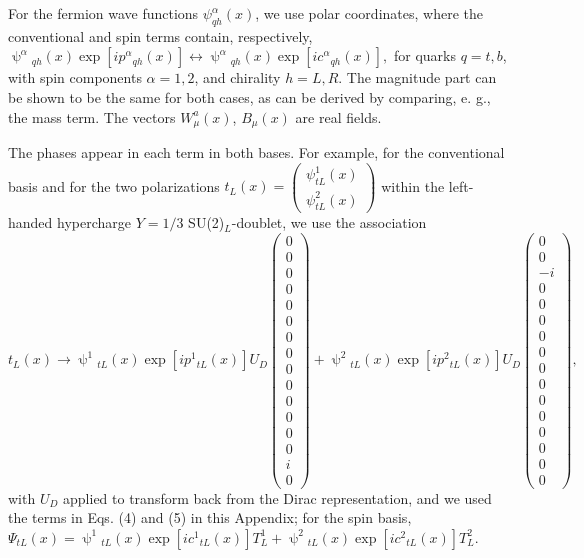 \documentclass[12pt]{article}
\renewcommand\[{\begin{dmath}}
\renewcommand\]{\end{dmath}}
\begin{document}
 For the fermion wave functions $ \psi_{qh}^\alpha(x)  $, we use  polar coordinates, where the conventional and spin terms contain,
 respectively, $\uppsi^\alpha{}   _{qh}(x) \exp{[i p^\alpha{}_{qh}(x)]} \leftrightarrow
 \uppsi^\alpha{}_{qh}(x) \exp{[i c^\alpha{}_{qh}(x)]},$   for quarks  $q=t,b$,  with spin components  $\alpha=1,2$, and chirality   $h=L,R$.
  The magnitude part can be shown to be the same for both cases, as can be derived by comparing, e. g., the mass term. The vectors $W_\mu^a(x)$,
 $B_\mu(x)$  are real fields.



The phases appear in each term in both bases. For example, for the conventional basis and for the two  polarizations   $     t_{L}(x)=\left(\begin{array}{lcr}
     \psi_{tL}^1(x) \\
  \psi_{tL}^2(x)
 \end{array}\right)$  within the   left-handed        hypercharge $Y =1/3$  SU(2)$_L$-doublet,
  we use the association
$t_{L}(x)\rightarrow \uppsi^1{} _{tL}(x)  \exp{[i p^1{}_{tL}(x)]} U_D \left(\begin{array}{lcr}
  0\\  0\\ 0\\ 0\\ 0\\ 0\\ 0\\ 0\\ 0\\ 0\\ 0\\ 0\\ 0\\ 0\\ i\\ 0
 \end{array}\right)+\uppsi^2{} _{tL}(x)  \exp{[i p^2{}_{tL}(x)]}U_D\left(\begin{array}{lcr}
  0\\  0\\ -i\\ 0\\ 0\\ 0\\ 0\\ 0\\ 0\\ 0\\ 0\\ 0\\ 0\\ 0\\ 0\\ 0
\end{array}\right),$ with  $U_D$   applied to transform back from the Dirac representation, and we used the terms in Eqs. (4) and (5) in this Appendix;
for  the spin basis,
${ \Psi_{tL} }(x)=  \uppsi^1{} _{tL}(x)  \exp{[i c^1{}_{tL}(x)]} T^1_L+ \uppsi^2{} _{tL}  (x)  \exp{[i c^2{}_{tL}(x)]} T^2_L $.
\end{document}
